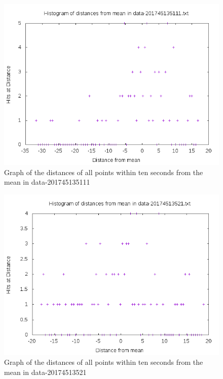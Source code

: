 \documentclass[10pt,letterpaper]{article}
\begin{document}
\begin{figure}[h]
\centering
\includegraphics[scale=0.5]{data-201745135111.png}
\caption{\label{fig:data-201745135111.png}Graph of the distances of all points within ten seconds from the mean in data-201745135111}
\end{figure}
\begin{figure}[h]
\centering
\includegraphics[scale=0.5]{data-20174513521.png}
\caption{\label{fig:data-20174513521.png}Graph of the distances of all points within ten seconds from the mean in data-20174513521}
\end{figure}
\end{document}
